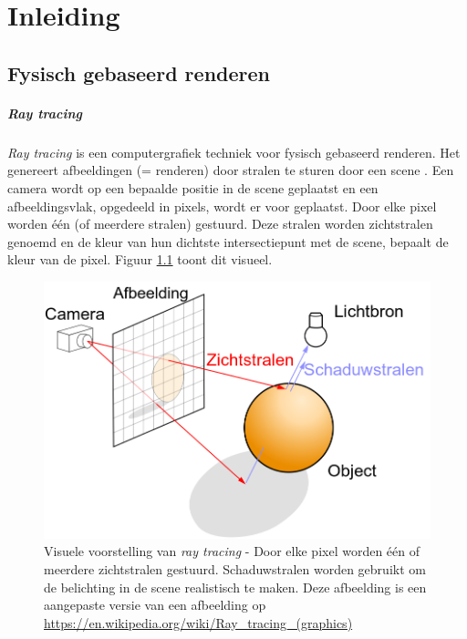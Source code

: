 \chapter{Inleiding}
\label{hoofdstuk:inleiding}

\section{Fysisch gebaseerd renderen}
\paragraph{Ray tracing}
\textit{Ray tracing} \cite{appel1968some} is een computergrafiek techniek voor fysisch gebaseerd renderen. Het genereert afbeeldingen (= renderen) door stralen te sturen door een scene \cite{Suffern:2007:RTG:1324795}. Een camera wordt op een bepaalde positie in de scene geplaatst en een afbeeldingsvlak, opgedeeld in pixels, wordt er voor geplaatst. Door elke pixel worden één (of meerdere stralen) gestuurd. Deze stralen worden zichtstralen genoemd en de kleur van hun dichtste intersectiepunt met de scene, bepaalt de kleur van de pixel. Figuur \ref{fig:raytracing} toont dit visueel.\\

\begin{figure}
    \centering
    \includegraphics[width=0.5\linewidth]{img/ray-tracing}
    \caption[Visuele voorstelling van \textit{ray tracing}]%
{Visuele voorstelling van \textit{ray tracing} - \small Door elke pixel worden één of meerdere zichtstralen gestuurd. Schaduwstralen worden gebruikt om de belichting in de scene realistisch te maken. Deze afbeelding is een aangepaste versie van een afbeelding op \url{https://en.wikipedia.org/wiki/Ray_tracing_(graphics)}}
    \label{fig:raytracing}    
\end{figure}

